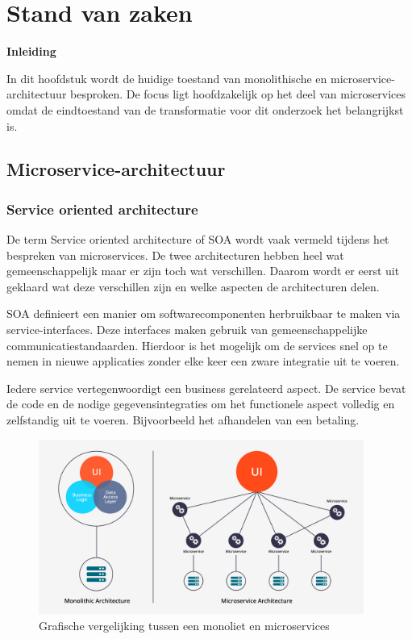 \label{ch:stand-van-zaken}
\graphicspath{{./img/}}

\chapter{Stand van zaken}
\textbf{Inleiding}

In dit hoofdstuk wordt de huidige toestand van monolithische en microservice-architectuur besproken. De focus ligt hoofdzakelijk op het deel van microservices omdat de eindtoestand van de transformatie voor dit onderzoek het belangrijkst is.

\section{Microservice-architectuur}

\subsection{Service oriented architecture}
De term Service oriented architecture of SOA wordt vaak vermeld tijdens het bespreken van microservices. De twee architecturen hebben heel wat gemeenschappelijk maar er zijn toch wat verschillen. Daarom wordt er eerst uit geklaard wat deze verschillen zijn en welke aspecten de architecturen delen. 

SOA definieert een manier om softwarecomponenten herbruikbaar te maken via service-interfaces. Deze interfaces maken gebruik van gemeenschappelijke communicatiestandaarden. Hierdoor is het mogelijk om de services snel op te nemen in nieuwe applicaties zonder elke keer een zware integratie uit te voeren.

Iedere service vertegenwoordigt een business gerelateerd aspect. De service bevat de code en de nodige gegevensintegraties om het functionele aspect volledig en zelfstandig uit te voeren. Bijvoorbeeld het afhandelen van een betaling.\\

\begin{figure}[!htb]
    \includegraphics[width=0.95\textwidth]{Microservices_vs_mono.png}
    \caption{Grafische vergelijking tussen een monoliet en microservices \label{microvsmono}}
    \centering

\end{figure}

